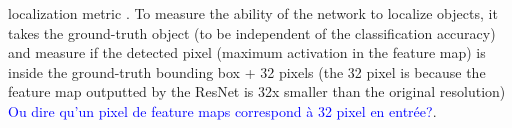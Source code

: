 \documentclass[letterpaper, 10 pt, conference]{ieeeconf}  %
\newcommand{\phil}[1]{\textcolor{blue}{#1}}
\begin{document}
localization metric \cite{oquab2015object}. To measure the ability of the network to localize objects, it takes the ground-truth object (to be independent of the classification accuracy) and measure if the detected pixel (maximum activation in the feature map) is inside the ground-truth bounding box + 32 pixels (the 32 pixel is because the feature map outputted by the ResNet is 32x smaller than the original resolution) \phil{Ou dire qu'un pixel de feature maps correspond à 32 pixel en entrée?}. %
\end{document}
